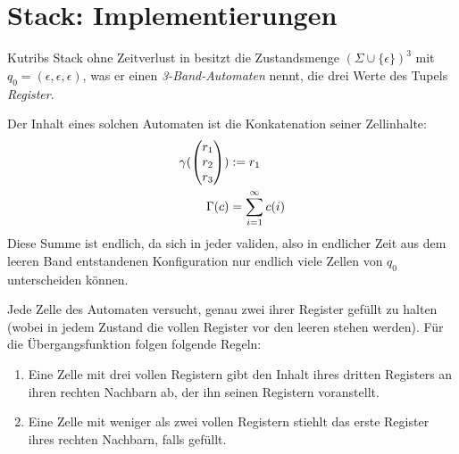 \documentclass{article}
\begin{document}
\section{Stack: Implementierungen}

Kutribs Stack ohne Zeitverlust in \cite{kutrib08} besitzt die Zustandsmenge $(\Sigma \cup \{\epsilon\})^3$ mit $q_0 = (\epsilon,\epsilon,\epsilon)$, was er einen \emph{3-Band-Automaten} nennt, die drei Werte des Tupels \emph{Register}.

Der Inhalt eines solchen Automaten ist die Konkatenation seiner Zellinhalte:
\begin{align*}
    \gamma(\begin{pmatrix}r_1\\r_2\\r_3\end{pmatrix}) &:= r_1 \\
\Gamma(c) &= \sum^\infty_{i=1} c(i)
\end{align*}
Diese Summe ist endlich, da sich in jeder validen, also in endlicher Zeit aus dem leeren Band entstandenen Konfiguration nur endlich viele Zellen von $q_0$ unterscheiden können.

Jede Zelle des Automaten versucht, genau zwei ihrer Register gefüllt zu halten (wobei in jedem Zustand die vollen Register vor den leeren stehen werden). Für die Übergangsfunktion folgen folgende Regeln:
\begin{enumerate}
    \item Eine Zelle mit drei vollen Registern gibt den Inhalt ihres dritten Registers an ihren rechten Nachbarn ab, der ihn seinen Registern voranstellt.
        \begin{center}
        \end{center}
    \item Eine Zelle mit weniger als zwei vollen Registern stiehlt das erste Register ihres rechten Nachbarn, falls gefüllt.
        \begin{center}
        \end{center}
\end{enumerate}
\end{document}
